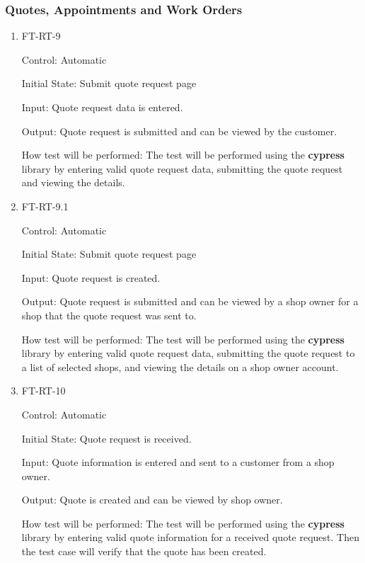 \documentclass[12pt, titlepage]{article}
\begin{document}
\subsubsection{Quotes, Appointments and Work Orders}
\begin{enumerate}

\item{FT-RT-9\\}

Control: Automatic
					
Initial State: Submit quote request page
					
Input: Quote request data is entered.
					
Output: Quote request is submitted and can be viewed by the customer.

How test will be performed: The test will be performed using the \textbf{cypress} library by entering valid quote request data, submitting the quote request and viewing the details.

\item{FT-RT-9.1\\}

Control: Automatic
					
Initial State: Submit quote request page
					
Input: Quote request is created.
					
Output: Quote request is submitted and can be viewed by a shop owner for a shop that the quote request was sent to.

How test will be performed: The test will be performed using the \textbf{cypress} library by entering valid quote request data, submitting the quote request to a list of selected shops, and viewing the details on a shop owner account.

\item{FT-RT-10\\}

Control: Automatic
					
Initial State: Quote request is received.
					
Input: Quote information is entered and sent to a customer from a shop owner.
					
Output: Quote is created and can be viewed by shop owner.

How test will be performed: The test will be performed using the \textbf{cypress} library by entering valid quote information for a received quote request. Then the test case will verify that the quote has been created.


\end{enumerate}
\end{document}
